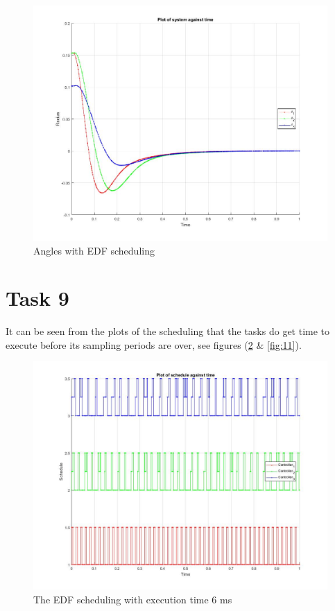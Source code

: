 \documentclass[a4paper,12pt,oneside,onecolumn]{article} %
\begin{document}
\begin{figure}[H]
    \centering
    \includegraphics[scale=0.3]{theta06_EDF.jpg}
    \caption{Angles with EDF scheduling}
    \label{fig:9}
\end{figure}


\section*{Task 9}
It can be seen from the plots of the scheduling that the tasks do get time to execute before its sampling periods are over, see figures (\ref{fig:10} \& \ref{fig:11}). 

\begin{figure}[H]
    \centering
    \includegraphics[scale=0.35]{schedule06_EDF.jpg}
    \caption{The EDF scheduling with execution time 6 ms}
    \label{fig:10}
\end{figure}
\end{document}
